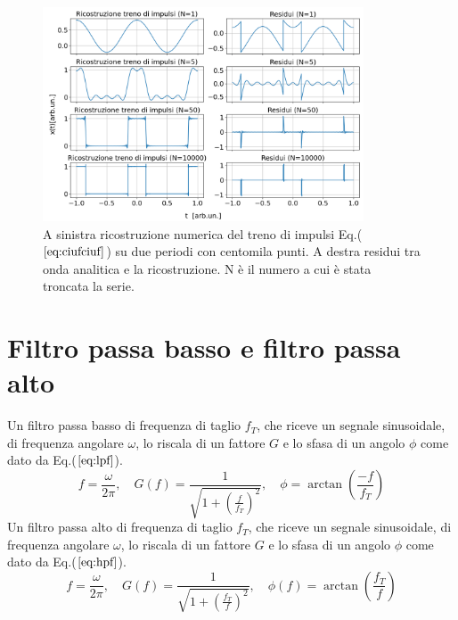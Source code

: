 \documentclass{article}
\begin{document}
    \begin{figure}[H]
        \centering
        \includegraphics[width=0.85\textwidth]{foupulsetrainwave1e5.png} %
        \caption{A sinistra ricostruzione numerica del treno di impulsi
        Eq.($\ref{eq:ciufciuf}$) su due periodi con centomila punti.
        A destra residui tra onda analitica e la ricostruzione.
        N è il numero a cui è stata troncata la serie. }
        \label{fig:ciufciuf2}
    \end{figure}



\section{Filtro passa basso e filtro passa alto}
    \label{sez:filt}
    Un filtro passa basso di frequenza di taglio $f_T$, che riceve un segnale sinusoidale, di 
    frequenza angolare $\omega$, lo riscala di un fattore $G$ e lo sfasa di un 
    angolo $\phi$ come dato da Eq.($\ref{eq:lpf}$).
        \begin{equation}
            f = \frac{\omega}{2\pi}, \quad 
            G(f) = \frac{1}{\sqrt{1 + \left(\frac{f}{f_T}\right)^2}}, \quad 
            \phi = \arctan\left(\frac{-f}{f_T}\right)
            \label{eq:lpf}
        \end{equation}
    Un filtro passa alto di frequenza di taglio $f_T$, che riceve un segnale sinusoidale, di 
    frequenza angolare $\omega$, lo riscala di un fattore $G$ e lo sfasa di un 
    angolo $\phi$ come dato da Eq.($\ref{eq:hpf}$).
        \begin{equation}
            f = \frac{\omega}{2\pi}, \quad 
            G(f) = \frac{1}{\sqrt{1 + \left(\frac{f_T}{f}\right)^2}}, \quad 
            \phi(f)= \arctan\left(\frac{f_T}{f}\right)
            \label{eq:hpf}
        \end{equation}
\end{document}
